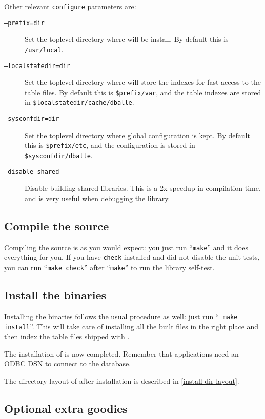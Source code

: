 Other relevant {\tt configure} parameters are:

\begin{description}
\item[{\tt --prefix=dir}] Set the toplevel directory where \dballe{} will be
                     install.  By default this is {\tt /usr/local}.
\item[{\tt --localstatedir=dir}] Set the toplevel directory where \dballe{} will
		     store the indexes for fast-access to the table files.  By
		     default this is {\tt \$prefix/var}, and the table indexes
		     are stored in {\tt \$localstatedir/cache/dballe}.
\item[{\tt --sysconfdir=dir}] Set the toplevel directory where global configuration
		     is kept.  By default this is {\tt \$prefix/etc}, and the
		     configuration is stored in {\tt \$sysconfdir/dballe}.
\item[{\tt --disable-shared}] Disable building shared libraries.  This is a 2x
		     speedup in compilation time, and is very useful when
		     debugging the library.
\end{description}

\subsection{Compile the source}

Compiling the source is as you would expect: you just run ``{\tt make}'' and it
does everything for you.  If you have {\tt check} installed and did not disable
the unit tests, you can run ``{\tt make check}'' after ``{\tt make}'' to run
the library self-test.

\subsection{Install the binaries}

Installing the binaries follows the usual procedure as well: just run ``{\tt
make install}''.  This will take care of installing all the built files in the
right place and then index the table files shipped with \dballe{}.

The installation of \dballe{} is now completed.  Remember that \dballe{}
applications need an ODBC DSN to connect to the database.

The directory layout of \dballe{} after installation is described in
\ref{install-dir-layout}.


\subsection{Optional extra goodies}

